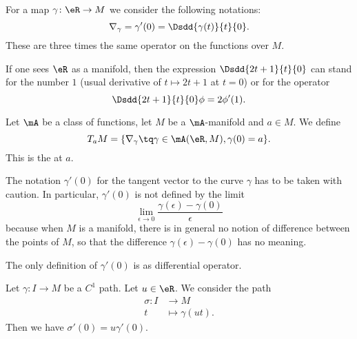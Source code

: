 For a map \(\gamma \colon \eR\to M  \) we consider the following notations:
\begin{equation}        \label{EQooJQVRooLziKoH}
	\nabla_{\gamma}=\gamma'(0)=\Dsdd{ \gamma(t) }{t}{0}.
\end{equation}
These are three times the same operator on the functions over \( M\).


If one sees \( \eR\) as a manifold, then the expression \( \Dsdd{ 2t+1 }{t}{0}\) can stand for the number \( 1\) (usual derivative of \( t\mapsto 2t+1\) at \( t=0\)) or for the operator
\begin{equation}
	\Dsdd{ 2t+1 }{t}{0}\phi=2\phi'(1).
\end{equation}


\begin{definition}      \label{DEFooJJGMooSdmMOa}
	Let \( \mA\) be a class of functions, let \( M\) be a \( \mA\)-manifold and \( a\in M\). We define
	\begin{equation}
		T_aM=\{ \nabla_{\gamma}\tq \gamma\in \mA(\eR,M),\gamma(0)=a \}.
	\end{equation}
	This is the  at \( a\).
\end{definition}


\begin{remark}      \label{REMooJQFHooQuoZxt}
	The notation \( \gamma'(0)\) for the tangent vector to the curve \( \gamma\) has to be taken with caution. In particular, \( \gamma'(0)\) is not defined by the limit
	\begin{equation}        \label{EQooVMGFooFUCNEY}
		\lim_{\epsilon\to 0} \frac{ \gamma(\epsilon)-\gamma(0) }{ \epsilon }
	\end{equation}
	because when \( M\) is a manifold, there is in general no notion of difference between the points of \( M\), so that the difference \( \gamma(\epsilon)-\gamma(0)\) has no meaning.

	The only definition of \( \gamma'(0)\) is as differential operator.
\end{remark}


\begin{lemma}        \label{LEMooMHSQooQyTZCg}
	Let \( \gamma\colon I\to M\) be a \( C^1\) path. Let \( u\in \eR\). We consider the path
	\begin{equation}
		\begin{aligned}
			\sigma\colon I & \to M               \\
			t              & \mapsto \gamma(ut).
		\end{aligned}
	\end{equation}
	Then we have \( \sigma'(0)=u\gamma'(0)\).
\end{lemma}

